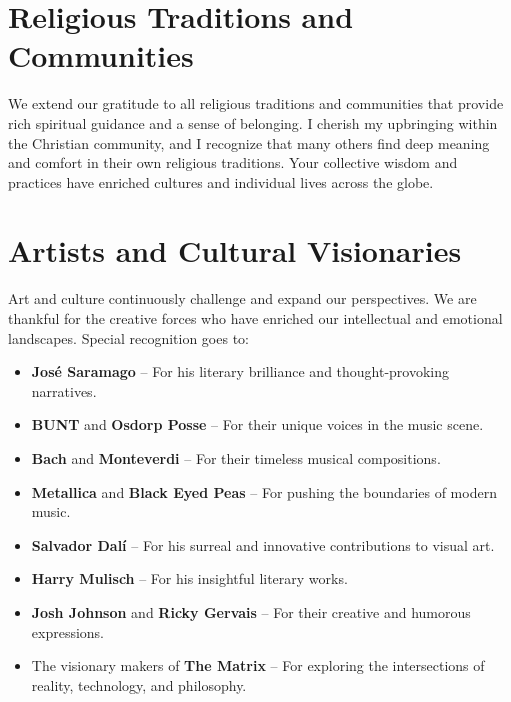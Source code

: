 \section*{Religious Traditions and Communities}
We extend our gratitude to all religious traditions and communities that provide rich spiritual guidance and a sense of belonging. I cherish my upbringing within the Christian community, and I recognize that many others find deep meaning and comfort in their own religious traditions. Your collective wisdom and practices have enriched cultures and individual lives across the globe.

\section*{Artists and Cultural Visionaries}
Art and culture continuously challenge and expand our perspectives. We are thankful for the creative forces who have enriched our intellectual and emotional landscapes. Special recognition goes to:
\begin{itemize}
    \item \textbf{José Saramago} – For his literary brilliance and thought-provoking narratives.
    \item \textbf{BUNT} and \textbf{Osdorp Posse} – For their unique voices in the music scene.
    \item \textbf{Bach} and \textbf{Monteverdi} – For their timeless musical compositions.
    \item \textbf{Metallica} and \textbf{Black Eyed Peas} – For pushing the boundaries of modern music.
    \item \textbf{Salvador Dalí} – For his surreal and innovative contributions to visual art.
    \item \textbf{Harry Mulisch} – For his insightful literary works.
    \item \textbf{Josh Johnson} and \textbf{Ricky Gervais} – For their creative and humorous expressions.
    \item The visionary makers of \textbf{The Matrix} – For exploring the intersections of reality, technology, and philosophy.
\end{itemize}


